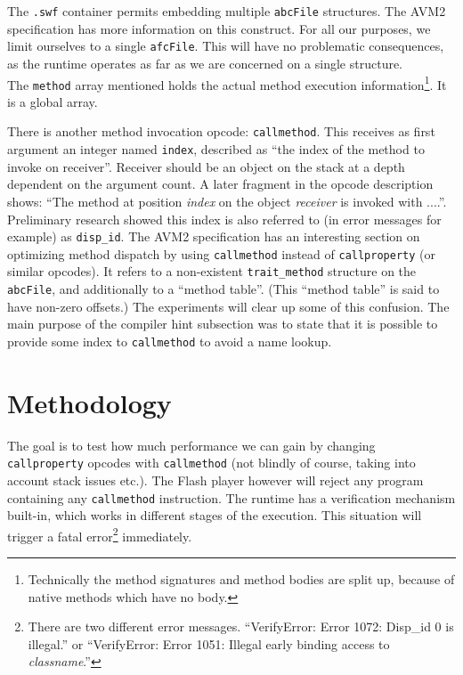 \documentclass[a4paper,11pt]{scrartcl}
\begin{document}
The \texttt{.swf} container permits embedding multiple \texttt{abcFile} structures. The AVM2 specification has more information on this construct. For all our purposes, we limit ourselves to a single \texttt{afcFile}. This will have no problematic consequences, as the runtime operates as far as we are concerned on a single structure. \\
The \texttt{method} array mentioned holds the actual method execution information\footnote{Technically the method signatures and method bodies are split up, because of native methods which have no body.}. It is a global array.

There is another method invocation opcode: \texttt{callmethod}. This receives as first argument an integer named \texttt{index}, described as ``the index of the method to invoke on receiver''. Receiver should be an object on the stack at a depth dependent on the argument count. A later fragment in the opcode description shows: ``The method at position \textit{index} on the object \textit{receiver} is invoked with ....''. Preliminary research showed this index is also referred to (in error messages for example) as \texttt{disp\_id}. The AVM2 specification has an interesting section on optimizing method dispatch by using \texttt{callmethod} instead of \texttt{callproperty} (or similar opcodes). It refers to a non-existent \texttt{trait\_method} structure on the \texttt{abcFile}, and additionally to a ``method table''. (This ``method table'' is said to have non-zero offsets.) The experiments will clear up some of this confusion. The main purpose of the compiler hint subsection was to state that it is possible to provide some index to \texttt{callmethod} to avoid a name lookup.


\section{Methodology}
\label{sec:methodology}

The goal is to test how much performance we can gain by changing \texttt{callproperty} opcodes with \texttt{callmethod} (not blindly of course, taking into account stack issues etc.). The Flash player however will reject any program containing any \texttt{callmethod} instruction. The runtime has a verification mechanism built-in, which works in different stages of the execution. This situation will trigger a fatal error\footnote{There are two different error messages. ``VerifyError: Error 1072: Disp\_id 0 is illegal.'' or ``VerifyError: Error 1051: Illegal early binding access to \textit{classname}.'' } immediately.
\end{document}
